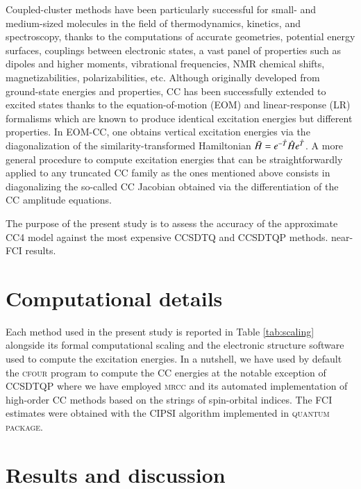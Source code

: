\documentclass[aip,jcp,reprint,noshowkeys,superscriptaddress]{revtex4-1}
\newcommand{\QP}{\textsc{quantum package}}
\newcommand{\MRCC}{\textsc{mrcc}}
\newcommand{\CFOUR}{\textsc{cfour}}
\newcommand{\hH}{\Hat{H}}
\newcommand{\hT}{\Hat{T}}
\newcommand{\bH}{\Bar{H}}
\begin{document}
Coupled-cluster methods have been particularly successful for small- and medium-sized molecules in the field of thermodynamics, kinetics, and spectroscopy, thanks to the computations of accurate geometries, potential energy surfaces, couplings between electronic states, a vast panel of properties such as dipoles and higher moments, vibrational frequencies, NMR chemical shifts, magnetizabilities, polarizabilities, etc.
Although originally developed from ground-state energies and properties, CC has been successfully extended to excited states thanks to the equation-of-motion (EOM) and linear-response (LR) formalisms which are known to produce identical excitation energies but different properties.
In EOM-CC, one obtains vertical excitation energies via the diagonalization of the similarity-transformed Hamiltonian $\bH = e^{-\hT} \hH e^{\hT}$.
A more general procedure to compute excitation energies that can be straightforwardly applied to any truncated CC family as the ones mentioned above consists in diagonalizing the so-called CC Jacobian obtained via the differentiation of the CC amplitude equations.

The purpose of the present study is to assess the accuracy of the approximate CC4 model against the most expensive CCSDTQ and CCSDTQP methods.
near-FCI results.

\section{Computational details}

Each method used in the present study is reported in Table \ref{tab:scaling} alongside its formal computational scaling and the electronic structure software used to compute the excitation energies.
In a nutshell, we have used by default the {\CFOUR} program to compute the CC energies at the notable exception of CCSDTQP where we have employed {\MRCC} and its automated implementation of high-order CC methods based on the strings of spin-orbital indices.
The FCI estimates were obtained with the CIPSI algorithm implemented in {\QP}.

\section{Results and discussion}
\end{document}
